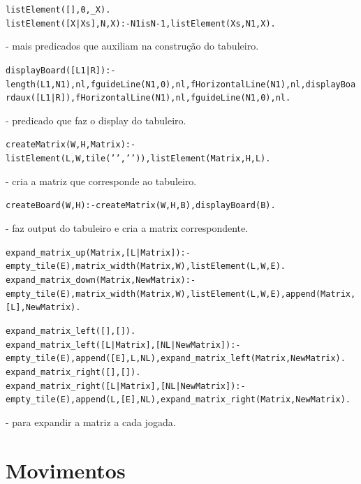 \documentclass[a4paper]{article}
\begin{document}
\begin{alltt}
	listElement([],0, _X).
	listElement([X|Xs], N, X) :- N1 is N - 1,  listElement(Xs, N1, X).
\end{alltt}
		\normalfont - mais predicados que auxiliam na construção do tabuleiro. 
\begin{alltt}
	displayBoard([L1|R]) :-  length(L1,N1), nl, fguideLine(N1, 0), nl, \newline fHorizontalLine(N1), nl, displayBoardaux([L1|R]), \newline fHorizontalLine(N1), nl, fguideLine(N1, 0), nl.
\end{alltt}
		\normalfont - predicado que faz o display do tabuleiro.

\begin{alltt}
	createMatrix(W, H, Matrix) :- listElement(L,W,tile(' ',' ')), \newline listElement(Matrix,H,L). 
\end{alltt}
		\normalfont - cria a matriz que corresponde ao tabuleiro.

\begin{alltt}
	createBoard(W,H) :- createMatrix(W,H, B), displayBoard(B).
\end{alltt}
		\normalfont - faz output do tabuleiro e cria a matrix correspondente.
\begin{alltt}
	expand_matrix_up(Matrix, [L|Matrix]) :- empty_tile( E ), \newline matrix_width(Matrix, W), listElement(L, W, E).
	expand_matrix_down(Matrix, NewMatrix) :- empty_tile( E ), \newline matrix_width(Matrix, W), listElement(L, W, E),\newline append(Matrix, [L], NewMatrix).

	expand_matrix_left([],[]).
	expand_matrix_left([L|Matrix], [NL|NewMatrix]):- empty_tile( E ), \newline append([E], L, NL), expand_matrix_left(Matrix, NewMatrix).
	expand_matrix_right([],[]).
	expand_matrix_right([L|Matrix], [NL|NewMatrix]):- empty_tile( E ), \newline append(L, [E], NL), expand_matrix_right(Matrix, NewMatrix). 
\end{alltt}
		\normalfont - para expandir a matriz a cada jogada. 


\section{Movimentos}
\end{document}
